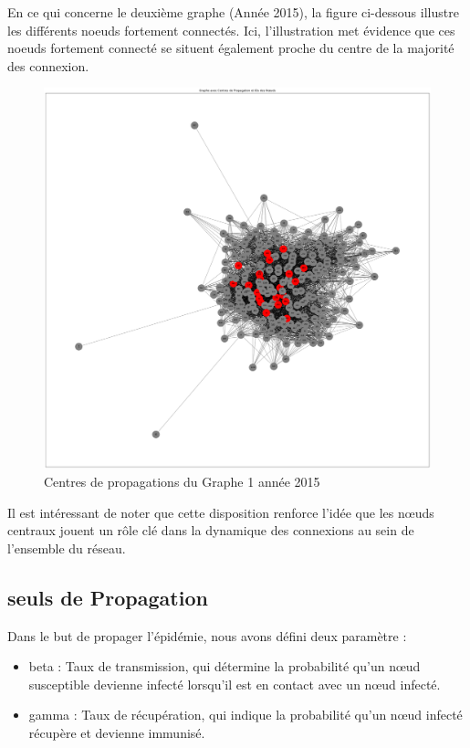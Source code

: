 \documentclass{article}
\begin{document}
En ce qui concerne le deuxième graphe (Année 2015), la figure ci-dessous illustre les différents noeuds fortement connectés. Ici, l'illustration met évidence que ces noeuds fortement connecté se situent également proche du centre de la majorité des connexion.

\begin{figure}[!h]
    \centering
    \includegraphics[width=16.4cm]{assets/epidemiologie/centre_propa_2015}
    \caption{Centres de propagations du Graphe 1 année 2015}
    \label{fig:centre_propa_2015}
\end{figure}

Il est intéressant de noter que cette disposition renforce l'idée que les nœuds centraux jouent un rôle clé dans la dynamique des connexions au sein de l'ensemble du réseau.

\subsection{seuls de Propagation}
Dans le but de propager l'épidémie, nous avons défini deux paramètre :
\begin{itemize}
    \item beta : Taux de transmission, qui détermine la probabilité qu'un nœud susceptible devienne infecté lorsqu'il est en contact avec un nœud infecté.
    \item gamma : Taux de récupération, qui indique la probabilité qu'un nœud infecté récupère et devienne immunisé.
\end{itemize}
\end{document}
